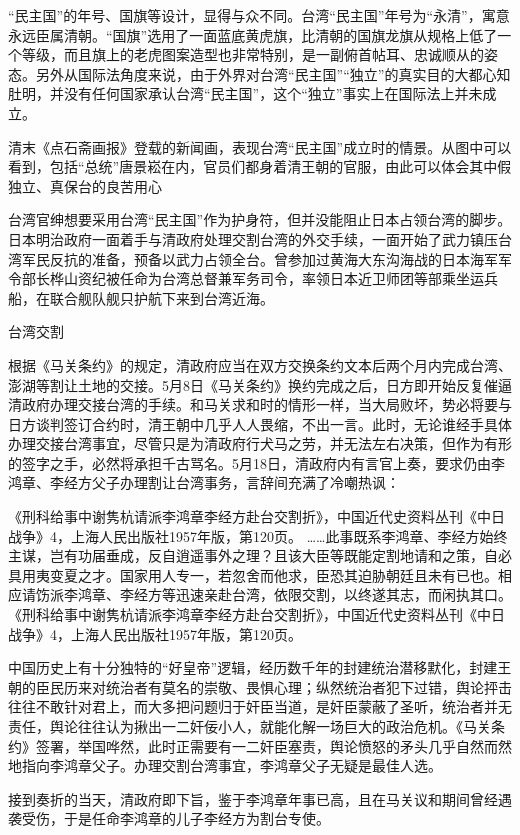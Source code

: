 \documentclass[12pt,UTF8]{ctexbook}
\begin{document}
“民主国”的年号、国旗等设计，显得与众不同。台湾“民主国”年号为“永清”，寓意永远臣属清朝。“国旗”选用了一面蓝底黄虎旗，比清朝的国旗龙旗从规格上低了一个等级，而且旗上的老虎图案造型也非常特别，是一副俯首帖耳、忠诚顺从的姿态。另外从国际法角度来说，由于外界对台湾“民主国”“独立”的真实目的大都心知肚明，并没有任何国家承认台湾“民主国”，这个“独立”事实上在国际法上并未成立。


清末《点石斋画报》登载的新闻画，表现台湾“民主国”成立时的情景。从图中可以看到，包括“总统”唐景崧在内，官员们都身着清王朝的官服，由此可以体会其中假独立、真保台的良苦用心

台湾官绅想要采用台湾“民主国”作为护身符，但并没能阻止日本占领台湾的脚步。日本明治政府一面着手与清政府处理交割台湾的外交手续，一面开始了武力镇压台湾军民反抗的准备，预备以武力占领全台。曾参加过黄海大东沟海战的日本海军军令部长桦山资纪被任命为台湾总督兼军务司令，率领日本近卫师团等部乘坐运兵船，在联合舰队舰只护航下来到台湾近海。

台湾交割

根据《马关条约》的规定，清政府应当在双方交换条约文本后两个月内完成台湾、澎湖等割让土地的交接。5月8日《马关条约》换约完成之后，日方即开始反复催逼清政府办理交接台湾的手续。和马关求和时的情形一样，当大局败坏，势必将要与日方谈判签订合约时，清王朝中几乎人人畏缩，不出一言。此时，无论谁经手具体办理交接台湾事宜，尽管只是为清政府行犬马之劳，并无法左右决策，但作为有形的签字之手，必然将承担千古骂名。5月18日，清政府内有言官上奏，要求仍由李鸿章、李经方父子办理割让台湾事务，言辞间充满了冷嘲热讽：

《刑科给事中谢隽杭请派李鸿章李经方赴台交割折》，中国近代史资料丛刊《中日战争》4，上海人民出版社1957年版，第120页。
……此事既系李鸿章、李经方始终主谋，岂有功届垂成，反自逍遥事外之理？且该大臣等既能定割地请和之策，自必具用夷变夏之才。国家用人专一，若忽舍而他求，臣恐其迫胁朝廷且未有已也。相应请饬派李鸿章、李经方等迅速亲赴台湾，依限交割，以终遂其志，而闲执其口。 《刑科给事中谢隽杭请派李鸿章李经方赴台交割折》，中国近代史资料丛刊《中日战争》4，上海人民出版社1957年版，第120页。

中国历史上有十分独特的“好皇帝”逻辑，经历数千年的封建统治潜移默化，封建王朝的臣民历来对统治者有莫名的崇敬、畏惧心理；纵然统治者犯下过错，舆论抨击往往不敢针对君上，而大多把问题归于奸臣当道，是奸臣蒙蔽了圣听，统治者并无责任，舆论往往认为揪出一二奸佞小人，就能化解一场巨大的政治危机。《马关条约》签署，举国哗然，此时正需要有一二奸臣塞责，舆论愤怒的矛头几乎自然而然地指向李鸿章父子。办理交割台湾事宜，李鸿章父子无疑是最佳人选。

接到奏折的当天，清政府即下旨，鉴于李鸿章年事已高，且在马关议和期间曾经遇袭受伤，于是任命李鸿章的儿子李经方为割台专使。
\end{document}
